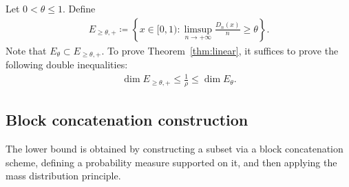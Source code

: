 \documentclass[12pt,reqno]{amsart}
\theoremstyle{definition}
\theoremstyle{plain}
\begin{document}
Let $0<\theta\leq1$. Define
\begin{align*}
    E_{\geq\theta,+}
    \coloneqq \left\{x\in[0,1):\limsup_{n\to+\infty}\frac{D_n(x)}{n}\geq \theta\right\}.
\end{align*}
Note that $E_\theta\subset E_{\geq\theta,+}$. To prove Theorem~\ref{thm:linear}, it suffices to prove the following double inequalities:
\begin{align*}
    \dim{E_{\geq\theta,+}}\leq \frac{1}{\rho} \leq\dim{E_\theta}.
\end{align*}

\subsection{Block concatenation construction}

The lower bound is obtained by constructing a subset via a block concatenation scheme, defining a probability measure supported on it, and then applying the mass distribution principle.
\end{document}
